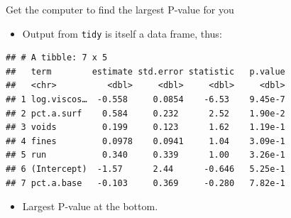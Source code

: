 \documentclass[ignorenonframetext,]{beamer}
\newenvironment{Shaded}{\begin{snugshade}}{\end{snugshade}}
\newcommand{\FloatTok}[1]{\textcolor[rgb]{0.00,0.00,0.81}{#1}}
\newcommand{\KeywordTok}[1]{\textcolor[rgb]{0.13,0.29,0.53}{\textbf{#1}}}
\newcommand{\NormalTok}[1]{#1}
\newcommand{\OperatorTok}[1]{\textcolor[rgb]{0.81,0.36,0.00}{\textbf{#1}}}
\newcommand{\StringTok}[1]{\textcolor[rgb]{0.31,0.60,0.02}{#1}}
\providecommand{\tightlist}{%
  \setlength{\itemsep}{0pt}\setlength{\parskip}{0pt}}
\begin{document}
\begin{frame}[fragile]{Get the computer to find the largest P-value for
you}
\protect\hypertarget{get-the-computer-to-find-the-largest-p-value-for-you}{}

\begin{itemize}
\tightlist
\item
  Output from \texttt{tidy} is itself a data frame, thus:
\end{itemize}

\begin{Shaded}
\end{Shaded}

\begin{verbatim}
## # A tibble: 7 x 5
##   term        estimate std.error statistic   p.value
##   <chr>          <dbl>     <dbl>     <dbl>     <dbl>
## 1 log.viscos…  -0.558     0.0854    -6.53    9.45e-7
## 2 pct.a.surf    0.584     0.232      2.52    1.90e-2
## 3 voids         0.199     0.123      1.62    1.19e-1
## 4 fines         0.0978    0.0941     1.04    3.09e-1
## 5 run           0.340     0.339      1.00    3.26e-1
## 6 (Intercept)  -1.57      2.44      -0.646   5.25e-1
## 7 pct.a.base   -0.103     0.369     -0.280   7.82e-1
\end{verbatim}

\begin{itemize}
\tightlist
\item
  Largest P-value at the bottom.
\end{itemize}

\end{frame}
\end{document}
